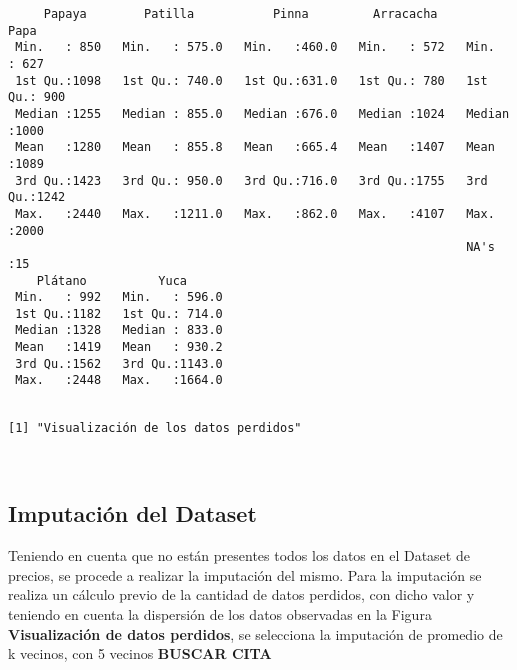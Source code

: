 \documentclass[11pt]{article}
\begin{document}
\begin{verbatim}
     Papaya        Patilla           Pinna         Arracacha         Papa     
 Min.   : 850   Min.   : 575.0   Min.   :460.0   Min.   : 572   Min.   : 627  
 1st Qu.:1098   1st Qu.: 740.0   1st Qu.:631.0   1st Qu.: 780   1st Qu.: 900  
 Median :1255   Median : 855.0   Median :676.0   Median :1024   Median :1000  
 Mean   :1280   Mean   : 855.8   Mean   :665.4   Mean   :1407   Mean   :1089  
 3rd Qu.:1423   3rd Qu.: 950.0   3rd Qu.:716.0   3rd Qu.:1755   3rd Qu.:1242  
 Max.   :2440   Max.   :1211.0   Max.   :862.0   Max.   :4107   Max.   :2000  
                                                                NA's   :15    
    Plátano          Yuca       
 Min.   : 992   Min.   : 596.0  
 1st Qu.:1182   1st Qu.: 714.0  
 Median :1328   Median : 833.0  
 Mean   :1419   Mean   : 930.2  
 3rd Qu.:1562   3rd Qu.:1143.0  
 Max.   :2448   Max.   :1664.0  
                                
    \end{verbatim}

    
    \begin{Verbatim}[commandchars=\\\{\}]
[1] "Visualización de los datos perdidos"

    \end{Verbatim}

    
    
    \begin{center}
    \end{center}
    { \hspace*{\fill} \\}
    
    \hypertarget{imputaciuxf3n-del-dataset}{%
\subsection{Imputación del Dataset}\label{imputaciuxf3n-del-dataset}}

    Teniendo en cuenta que no están presentes todos los datos en el Dataset
de precios, se procede a realizar la imputación del mismo. Para la
imputación se realiza un cálculo previo de la cantidad de datos
perdidos, con dicho valor y teniendo en cuenta la dispersión de los
datos observadas en la Figura \textbf{Visualización de datos perdidos},
se selecciona la imputación de promedio de k vecinos, con 5 vecinos
\textbf{BUSCAR CITA}
\end{document}
